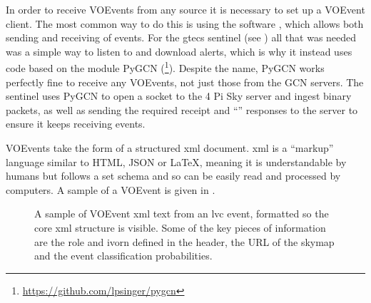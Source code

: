\begin{colsection}
\begin{colsection}
In order to receive VOEvents from any source it is necessary to set up a VOEvent client. The most common way to do this is using the  software \citep{comet}, which allows both sending and receiving of events. For the \gls{gtecs} sentinel (see ) all that was needed was a simple way to listen to and download alerts, which is why it instead uses code based on the  module PyGCN (\footnote{\url{https://github.com/lpsinger/pygcn}}). Despite the name, PyGCN works perfectly fine to receive any VOEvents, not just those from the GCN servers. The sentinel uses PyGCN to open a socket to the 4 Pi Sky server and ingest binary packets, as well as sending the required receipt and ``'' responses to the server to ensure it keeps receiving events.

VOEvents take the form of a structured \gls{xml} document. \gls{xml} is a ``markup'' language similar to HTML, JSON or \LaTeX, meaning it is understandable by humans but follows a set schema and so can be easily read and processed by computers. A sample of a VOEvent is given in .

\begin{figure}[p]
    
    \caption[VOEvent XML sample]{
        A sample of VOEvent \gls{xml} text from an \gls{lvc} event, formatted so the core \gls{xml} structure is visible. Some of the key pieces of information are the role and \gls{ivorn} defined in the header, the URL of the skymap and the event classification probabilities.
    }\label{fig:voevent_xml}
\end{figure}

\newpage

\end{colsection}


\end{colsection}


\newpage
